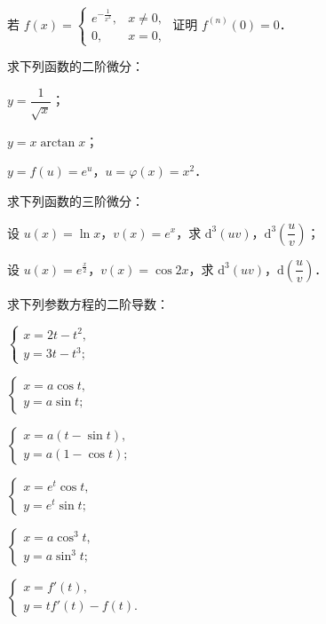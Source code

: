 \begin{xiti}
\item 若 $f(x)=\begin{cases}e^{-\frac{1}{x^{2}}}, & x\neq0,\\ 0, & x=0,\end{cases}$ 证明 $f^{(n)}(0)=0$．

\item 求下列函数的二阶微分：
\begin{ziti}
\item $y=\dfrac{1}{\sqrt{x}}$；
\item $y=x\arctan x$；
\item $y=f(u)=e^{u}$，$u=\varphi(x)=x^{2}$．
\end{ziti}

\item 求下列函数的三阶微分：
\begin{ziti}
\item 设 $u(x)=\ln x$，$v(x)=e^{x}$，求 $\mathrm{d}^{3}(uv)$，$\mathrm{d}^{3}\left(\dfrac{u}{v}\right)$；
\item 设 $u(x)=e^{\frac{x}{2}}$，$v(x)=\cos 2x$，求 $\mathrm{d}^{3}(uv)$，$\mathrm{d}\left(\dfrac{u}{v}\right)$．
\end{ziti}

\item 求下列参数方程的二阶导数：
\begin{ziti}
\item $\begin{cases}x=2t-t^{2},\\ y=3t-t^{3};\end{cases}$
\item $\begin{cases}x=a\cos t,\\ y=a\sin t;\end{cases}$
\item $\begin{cases}x=a(t-\sin t),\\ y=a(1-\cos t);\end{cases}$
\item $\begin{cases}x=e^{t}\cos t,\\ y=e^{t}\sin t;\end{cases}$
\item $\begin{cases}x=a\cos^{3}t,\\ y=a\sin^{3}t;\end{cases}$
\item $\begin{cases}x=f'(t),\\ y=tf'(t)-f(t).\end{cases}$
\end{ziti}


\end{xiti}

